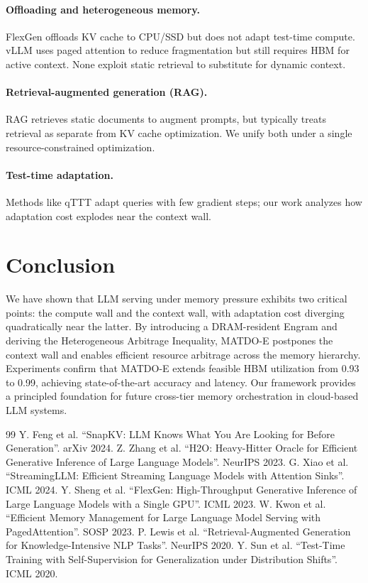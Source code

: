 \documentclass[11pt,a4paper]{article}
\theoremstyle{plain}
\theoremstyle{definition}
\begin{document}
\paragraph{Offloading and heterogeneous memory.} FlexGen \cite{flexgen} offloads KV cache to CPU/SSD but does not adapt test-time compute. vLLM \cite{vllm} uses paged attention to reduce fragmentation but still requires HBM for active context. None exploit static retrieval to substitute for dynamic context.

\paragraph{Retrieval-augmented generation (RAG).} RAG \cite{rag} retrieves static documents to augment prompts, but typically treats retrieval as separate from KV cache optimization. We unify both under a single resource-constrained optimization.

\paragraph{Test-time adaptation.} Methods like qTTT \cite{qttt} adapt queries with few gradient steps; our work analyzes how adaptation cost explodes near the context wall.

\section{Conclusion}
We have shown that LLM serving under memory pressure exhibits two critical points: the compute wall and the context wall, with adaptation cost diverging quadratically near the latter. By introducing a DRAM-resident Engram and deriving the Heterogeneous Arbitrage Inequality, MATDO-E postpones the context wall and enables efficient resource arbitrage across the memory hierarchy. Experiments confirm that MATDO-E extends feasible HBM utilization from 0.93 to 0.99, achieving state-of-the-art accuracy and latency. Our framework provides a principled foundation for future cross-tier memory orchestration in cloud-based LLM systems.


\begin{thebibliography}{99}
 Y. Feng et al. ``SnapKV: LLM Knows What You Are Looking for Before Generation''. arXiv 2024.
 Z. Zhang et al. ``H2O: Heavy-Hitter Oracle for Efficient Generative Inference of Large Language Models''. NeurIPS 2023.
 G. Xiao et al. ``StreamingLLM: Efficient Streaming Language Models with Attention Sinks''. ICML 2024.
 Y. Sheng et al. ``FlexGen: High-Throughput Generative Inference of Large Language Models with a Single GPU''. ICML 2023.
 W. Kwon et al. ``Efficient Memory Management for Large Language Model Serving with PagedAttention''. SOSP 2023.
 P. Lewis et al. ``Retrieval-Augmented Generation for Knowledge-Intensive NLP Tasks''. NeurIPS 2020.
 Y. Sun et al. ``Test-Time Training with Self-Supervision for Generalization under Distribution Shifts''. ICML 2020.
\end{thebibliography}
\end{document}
